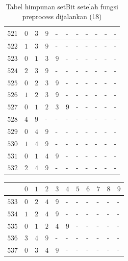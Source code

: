 \begin{appendices}
\begin{table}[H]
\begin{tabular} {|l|l|l|l|l|l|l|l|l|l|l|}
  		$ 521 $ & $ 0 $ &$ 3 $ &$ 9 $ & - &  - &  - &  - &  - &  - &  -   \\ \hline
  		$ 522 $ & $ 1 $ &$ 3 $ &$ 9 $ & - &  - &  - &  - &  - &  - &  -   \\ \hline
  		$ 523 $ & $ 0 $ &$ 1 $ &$ 3 $ &$ 9 $ & - &  - &  - &  - &  - &  -   \\ \hline
  		$ 524 $ & $ 2 $ &$ 3 $ &$ 9 $ & - &  - &  - &  - &  - &  - &  -   \\ \hline
  		$ 525 $ & $ 0 $ &$ 2 $ &$ 3 $ &$ 9 $ & - &  - &  - &  - &  - &  -   \\ \hline
  		$ 526 $ & $ 1 $ &$ 2 $ &$ 3 $ &$ 9 $ & - &  - &  - &  - &  - &  -   \\ \hline
  		$ 527 $ & $ 0 $ &$ 1 $ &$ 2 $ &$ 3 $ &$ 9 $ & - &  - &  - &  - &  -   \\ \hline
  		$ 528 $ & $ 4 $ &$ 9 $ & - &  - &  - &  - &  - &  - &  - &  -   \\ \hline
  		$ 529 $ & $ 0 $ &$ 4 $ &$ 9 $ & - &  - &  - &  - &  - &  - &  -   \\ \hline
  		$ 530 $ & $ 1 $ &$ 4 $ &$ 9 $ & - &  - &  - &  - &  - &  - &  -   \\ \hline
  		$ 531 $ & $ 0 $ &$ 1 $ &$ 4 $ &$ 9 $ & - &  - &  - &  - &  - &  -   \\ \hline
  		$ 532 $ & $ 2 $ &$ 4 $ &$ 9 $ & - &  - &  - &  - &  - &  - &  -   \\ \hline  		
  	\end{tabular}\caption{Tabel himpunan setBit setelah fungsi preprocess dijalankan (18)}
  	\label{tab:setbit_18}
  \end{table}
  \begin{table}[H]
  	\centering
  	\begin{tabular} {|l|l|l|l|l|l|l|l|l|l|l|} \hline
  		\backslashbox{$Num$}{$index$} & $ 0 $ & $ 1 $ & $ 2 $ & $ 3 $ & $ 4 $ & $ 5 $ & $ 6 $ & $ 7 $ & $ 8 $ & $ 9 $ \\ \hline
  		$ 533 $ & $ 0 $ &$ 2 $ &$ 4 $ &$ 9 $ & - &  - &  - &  - &  - &  -   \\ \hline
  		$ 534 $ & $ 1 $ &$ 2 $ &$ 4 $ &$ 9 $ & - &  - &  - &  - &  - &  -   \\ \hline
  		$ 535 $ & $ 0 $ &$ 1 $ &$ 2 $ &$ 4 $ &$ 9 $ & - &  - &  - &  - &  -   \\ \hline
  		$ 536 $ & $ 3 $ &$ 4 $ &$ 9 $ & - &  - &  - &  - &  - &  - &  -   \\ \hline
  		$ 537 $ & $ 0 $ &$ 3 $ &$ 4 $ &$ 9 $ & - &  - &  - &  - &  - &  -   \\ \hline

\end{tabular}
\end{table}
\end{appendices}
